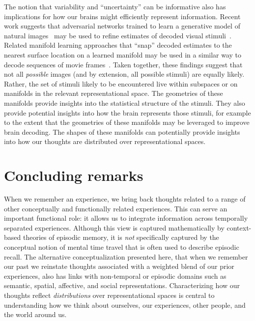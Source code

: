 \documentclass{article}
\begin{document}
The notion that variability and ``uncertainty'' can be informative also has implications for how our brains might efficiently represent information.  Recent work suggests that adversarial networks trained to learn a generative model of natural images~\citep[e.g., ][]{GatyEtal16, IsolEtal17} may be used to refine estimates of decoded visual stimuli~\citep{StYvNase18}. Related manifold learning approaches that ``snap'' decoded estimates to the nearest surface location on a learned manifold may be used in a similar way to decode sequences of movie frames~\citep{HeusEtal18a}.  Taken together, these findings suggest that not all \textit{possible} images (and by extension, all possible stimuli) are equally likely.  Rather, the set of stimuli likely to be encountered live within subspaces or on manifolds in the relevant representational space.  The geometries of these manifolds provide insights into the statistical structure of the stimuli.  They also provide potential insights into how the brain represents those stimuli, for example to the extent that the geometries of these manifolds may be leveraged to improve brain decoding.  The shapes of these manifolds can potentially provide insights into how our thoughts are distributed over representational spaces.

\section*{Concluding remarks}
When we remember an experience, we bring back thoughts related to a range of other conceptually and functionally related experiences.  This can serve an important functional role: it allows us to integrate information across temporally separated experiences.  Although this view is captured mathematically by context-based theories of episodic memory, it is \textit{not} specifically captured by the conceptual notion of mental time travel that is often used to describe episodic recall.  The alternative conceptualization presented here, that when we remember our past we reinstate thoughts associated with a weighted blend of our prior experiences, also has links with non-temporal or episodic domains such as semantic, spatial, affective, and social representations.  Characterizing how our thoughts reflect \textit{distributions} over representational spaces is central to understanding how we think about ourselves, our experiences, other people, and the world around us.
\end{document}
